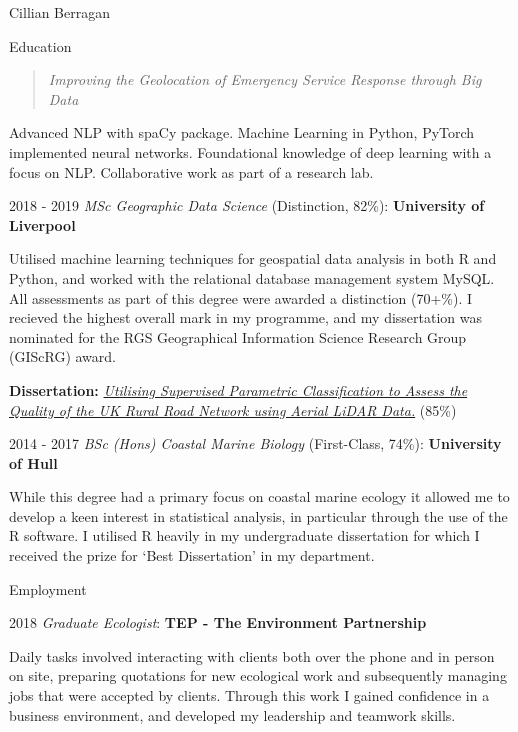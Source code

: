 \documentclass{scrartcl}
\begin{document}
\begin{cv}{Cillian Berragan}
\begin{cvlist}{Education}
    \begin{quote}
        \small \textit{Improving the Geolocation of Emergency Service Response through Big Data}
    \end{quote}

    \small Advanced NLP with spaCy package. Machine Learning in Python, PyTorch implemented neural networks. Foundational knowledge of deep learning with a focus on NLP. Collaborative work as part of a research lab.

\item[2018 - 2019] \normalsize\textit{MSc Geographic Data Science} (Distinction, 82\%): \textbf{University of Liverpool}

    \small Utilised machine learning techniques for geospatial data analysis in both R and Python, and worked with the relational database management system MySQL. All assessments as part of this degree were awarded a distinction (70+\%). I recieved the highest overall mark in my programme, and my dissertation was nominated for the RGS Geographical Information Science Research Group (GIScRG) award.

        \textbf{Dissertation:} \textit{\href{https://github.com/cjber/dissertation/blob/master/201374125.pdf}{Utilising Supervised Parametric Classification to Assess the Quality of the UK Rural Road Network using Aerial LiDAR Data.}} (85\%)
    \item[2014 - 2017] \normalsize\textit{BSc (Hons) Coastal Marine Biology} (First-Class, 74\%): \textbf{University of Hull}

    \small While this degree had a primary focus on coastal marine ecology it allowed me to develop a keen interest in statistical analysis, in particular through the use of the R software. I utilised R heavily in my undergraduate dissertation for which I received the prize for ‘Best Dissertation’ in my department.

\end{cvlist}

\begin{cvlist}{Employment}

    \item[2018] \normalsize\textit{Graduate Ecologist}: \textbf{TEP - The Environment Partnership}

    \small Daily tasks involved interacting with clients both over the phone and in person on site, preparing quotations for new ecological work and subsequently managing jobs that were accepted by clients. Through this work I gained confidence in a business environment, and developed my leadership and teamwork skills.


\end{cvlist}
\end{cv}
\end{document}
